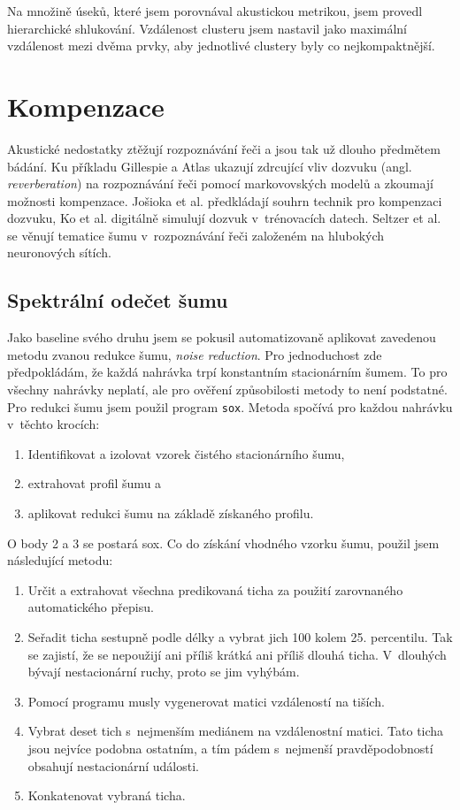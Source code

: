 Na množině úseků, které jsem porovnával akustickou metrikou, jsem provedl
hierarchické shlukování\cite{johnson1967hierarchical}. Vzdálenost clusteru jsem nastavil jako maximální
vzdálenost mezi dvěma prvky, aby jednotlivé clustery byly co nejkompaktnější.

\section{Kompenzace}
\label{sec:akustika:kompenzace}

Akustické nedostatky ztěžují rozpoznávání řeči a jsou tak už dlouho předmětem
bádání. Ku příkladu Gillespie a Atlas\cite{gillespie2002diversity} ukazují
zdrcující vliv dozvuku (angl. {\em reverberation}) na rozpoznávání řeči pomocí
markovovských modelů a zkoumají možnosti kompenzace. Jošioka et
al.\cite{reverbmagazine} předkládají souhrn technik pro kompenzaci dozvuku, Ko
et al.\cite{reverbaugment} digitálně simulují dozvuk v~trénovacích datech.
Seltzer et al.\cite{dnnnoiserobust} se věnují tematice šumu v~rozpoznávání řeči
založeném na hlubokých neuronových sítích.

\subsection{Spektrální odečet šumu}

Jako baseline svého druhu jsem se pokusil automatizovaně aplikovat zavedenou
metodu zvanou redukce šumu, \textit{noise reduction}. Pro jednoduchost zde
předpokládám, že každá nahrávka trpí konstantním stacionárním šumem. To pro
všechny nahrávky neplatí, ale pro ověření způsobilosti metody to není podstatné.
Pro redukci šumu jsem použil program \texttt{sox}. Metoda spočívá pro každou
nahrávku v~těchto krocích:
\begin{enumerate}
\item{Identifikovat a izolovat vzorek čistého stacionárního šumu,}
\item{extrahovat profil šumu a}
\item{aplikovat redukci šumu na základě získaného profilu.}
\end{enumerate}

O body 2 a 3 se postará sox. Co do získání vhodného vzorku šumu, použil jsem
následující metodu:
\begin{enumerate}
\item{
    Určit a extrahovat všechna predikovaná ticha za použití zarovnaného
    automatického přepisu.
}
\item{
    Seřadit ticha sestupně podle délky a vybrat jich 100 kolem 25. percentilu.
    Tak se zajistí, že se nepoužijí ani příliš krátká ani příliš dlouhá ticha.
    V~dlouhých bývají nestacionární ruchy, proto se jim vyhýbám.
}
\item{
    Pomocí programu musly vygenerovat matici vzdáleností na tiších.
}
\item{
    Vybrat deset tich s~nejmenším mediánem na vzdálenostní matici. Tato ticha
    jsou nejvíce podobna ostatním, a tím pádem s~nejmenší pravděpodobností
    obsahují nestacionární události.
}
\item{
    Konkatenovat vybraná ticha.
}
\end{enumerate}

